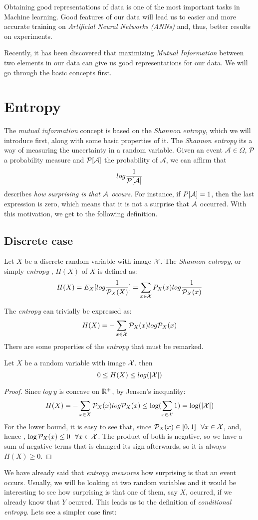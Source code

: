 Obtaining good representations of data is one of the most important tasks in Machine learning. Good features of our data will lead us to easier and more accurate training on \emph{Artificial Neural Networks (ANNs)} and, thus, better results on experiments.

Recently, it has been discovered that maximizing \emph{Mutual Information} between two elements in our data can give us good representations for our data. We will go through the basic concepts first.


\section{Entropy}

The \emph{mutual information} concept is based on the \emph{Shannon entropy}, which we will introduce first, along with some basic properties of it. The \emph{Shannon entropy} its a way of measuring the uncertainty in a random variable. Given an event $\mathcal A \in \Omega$, $\mathcal{P}$ a probability measure and $\mathcal{P}[\mathcal A]$ the probability of $\mathcal A$, we can affirm that 
$$
log\frac{1}{\mathcal{P}[\mathcal A]}
$$
describes \emph{how surprising is that $\mathcal A$ occurs}. For instance, if $P[\mathcal A] = 1$, then the last expression is zero, which means that it is not a surprise that $\mathcal A$ occurred. With this motivation, we get to the following definition.

\subsection{Discrete case}

\begin{ndef}
Let $X$ be a discrete random variable with image $\mathcal{X}$. The \emph{Shannon entropy}, or simply \emph{entropy} , $H(X)$ of $X$ is defined as:
$$
H(X) = E_X[log\frac{1}{\mathcal{P}_X(X)}] =  \sum_{x \in \mathcal{X}} P_X(x) log\frac{1}{\mathcal{P}_X(x)}
$$
\end{ndef}
The \emph{entropy} can trivially be expressed as:
$$
H(X) = - \sum_{x \in \mathcal{X}}\mathcal{P}_X (x)log \mathcal{P}_X(x)
$$
There are some properties of the \emph{entropy} that must be remarked. 
\begin{nprop}
    Let $X$ be a random variable with image $\mathcal{X}$. then
    $$
0 \leq H(X) \leq log(|\mathcal{X}|)
    $$
\end{nprop}
\begin{proof}
    Since $log \ y$ is concave on $\mathbb{R}^+$, by Jensen's inequality:
    $$
    H(X) = - \sum_{x \in X}\mathcal{P}_X (x)log \mathcal{P}_X(x) \leq \log(\sum_{x \in \mathcal{X}} 1) = \log(|\mathcal{X}|)
    $$
    For the lower bound, it is easy to see that, since $\mathcal{P}_X(x) \in [0,1] \ \  \forall x \in \mathcal{X} $, and, hence , $\log \Prob_X(x) \leq 0 \ \ \forall x \in \X$. The product of both is negative, so we have a sum of negative terms that is changed its sign afterwards, so it is always $H(X) \geq 0$. 
\end{proof}
We have already said that \emph{entropy measures} how surprising is that an event occurs. Usually, we will be looking at two random variables and it would be interesting to see how surprising is that one of them, say $X$, ocurred, if we already know that $Y$ ocurred. This leads us to the definition of \emph{conditional entropy}. Lets see a simpler case first:

